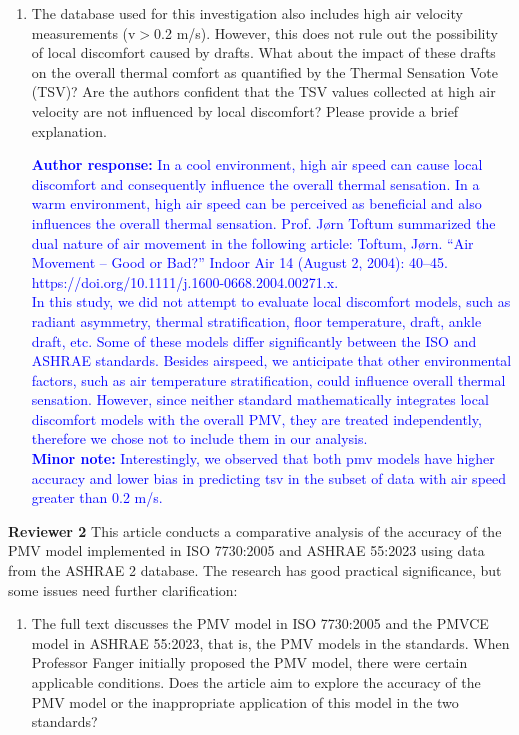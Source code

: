 \documentclass[a4paper, 10pt]{letter}
\newcommand{\response}[1]{\textcolor{blue}{\textbf{Author response:} #1}}
\begin{document}
\begin{letter}
\begin{enumerate}
            \item The database used for this investigation also includes high air velocity measurements (v$>$0.2 m/s).
            However, this does not rule out the possibility of local discomfort caused by drafts.
            What about the impact of these drafts on the overall thermal comfort as quantified by the Thermal Sensation Vote (TSV)?
            Are the authors confident that the TSV values collected at high air velocity are not influenced by local discomfort?
            Please provide a brief explanation.

            \response{In a cool environment, high air speed can cause local discomfort and consequently influence the overall thermal sensation.
            In a warm environment, high air speed can be perceived as beneficial and also influences the overall thermal sensation. Prof. Jørn Toftum summarized the dual nature of air movement in the following article: Toftum, Jørn. “Air Movement – Good or Bad?” Indoor Air 14 (August 2, 2004): 40–45. https://doi.org/10.1111/j.1600-0668.2004.00271.x.\\
            In this study, we did not attempt to evaluate local discomfort models, such as radiant asymmetry, thermal stratification, floor temperature, draft, ankle draft, etc. 
            Some of these models differ significantly between the ISO and ASHRAE standards. 
            Besides airspeed, we anticipate that other environmental factors, such as air temperature stratification, could influence overall thermal sensation. 
            However, since neither standard mathematically integrates local discomfort models with the overall PMV, they are treated independently, therefore we chose not to include them in our analysis.\\
            \textbf{Minor note:} Interestingly, we observed that both \ac{pmv} models have higher accuracy and lower bias in predicting \ac{tsv} in the subset of data with air speed greater than 0.2 m/s.}
        \end{enumerate}

        \textbf{Reviewer 2}
        This article conducts a comparative analysis of the accuracy of the PMV model implemented in ISO 7730:2005 and ASHRAE 55:2023 using data from the ASHRAE 2 database.
        The research has good practical significance, but some issues need further clarification:

        \begin{enumerate}
            \item The full text discusses the PMV model in ISO 7730:2005 and the PMVCE model in ASHRAE 55:2023, that is, the PMV models in the standards.
            When Professor Fanger initially proposed the PMV model, there were certain applicable conditions.
            Does the article aim to explore the accuracy of the PMV model or the inappropriate application of this model in the two standards?


\end{enumerate}
\end{letter}
\end{document}
